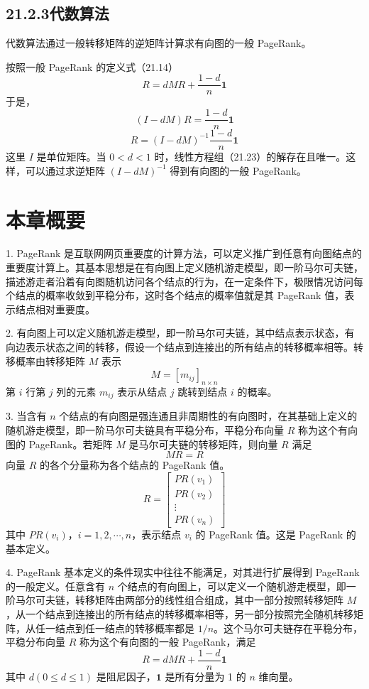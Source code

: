 \documentclass[UTF8, 12pt, fontset=fandol, oneside]{ctexart}
\begin{document}
\subsection*{21.2.3\quad 代数算法}

代数算法通过一般转移矩阵的逆矩阵计算求有向图的一般 PageRank。

按照一般 PageRank 的定义式（21.14）
\[
R=dMR+\frac{1-d}{n}\mathbf{1}
\]
于是，
\begin{equation}
(I-dM)R=\frac{1-d}{n}\mathbf{1}
\tag{21.23}
\end{equation}
\begin{equation}
R=(I-dM)^{-1}\frac{1-d}{n}\mathbf{1}
\tag{21.24}
\end{equation}
这里 $I$ 是单位矩阵。当 $0<d<1$ 时，线性方程组（21.23）的解存在且唯一。这样，可以通过求逆矩阵 $(I-dM)^{-1}$ 得到有向图的一般 PageRank。

\section*{本章概要}

1. PageRank 是互联网网页重要度的计算方法，可以定义推广到任意有向图结点的重要度计算上。其基本思想是在有向图上定义随机游走模型，即一阶马尔可夫链，描述游走者沿着有向图随机访问各个结点的行为，在一定条件下，极限情况访问每个结点的概率收敛到平稳分布，这时各个结点的概率值就是其 PageRank 值，表示结点相对重要度。

2. 有向图上可以定义随机游走模型，即一阶马尔可夫链，其中结点表示状态，有向边表示状态之间的转移，假设一个结点到连接出的所有结点的转移概率相等。转移概率由转移矩阵 $M$ 表示
\[
M=[m_{ij}]_{n\times n}
\]
第 $i$ 行第 $j$ 列的元素 $m_{ij}$ 表示从结点 $j$ 跳转到结点 $i$ 的概率。

3. 当含有 $n$ 个结点的有向图是强连通且非周期性的有向图时，在其基础上定义的随机游走模型，即一阶马尔可夫链具有平稳分布，平稳分布向量 $R$ 称为这个有向图的 PageRank。若矩阵 $M$ 是马尔可夫链的转移矩阵，则向量 $R$ 满足
\[
MR=R
\]
向量 $R$ 的各个分量称为各个结点的 PageRank 值。
\[
R=
\begin{bmatrix}
PR(v_1)\\
PR(v_2)\\
\vdots\\
PR(v_n)
\end{bmatrix}
\]
其中 $PR(v_i)$，$i=1,2,\cdots,n$，表示结点 $v_i$ 的 PageRank 值。这是 PageRank 的基本定义。

4. PageRank 基本定义的条件现实中往往不能满足，对其进行扩展得到 PageRank 的一般定义。任意含有 $n$ 个结点的有向图上，可以定义一个随机游走模型，即一阶马尔可夫链，转移矩阵由两部分的线性组合组成，其中一部分按照转移矩阵 $M$，从一个结点到连接出的所有结点的转移概率相等，另一部分按照完全随机转移矩阵，从任一结点到任一结点的转移概率都是 $1/n$。这个马尔可夫链存在平稳分布，平稳分布向量 $R$ 称为这个有向图的一般 PageRank，满足
\[
R=dMR+\frac{1-d}{n}\mathbf{1}
\]
其中 $d(0\leqslant d\leqslant 1)$ 是阻尼因子，$\mathbf{1}$ 是所有分量为 1 的 $n$ 维向量。
\end{document}
